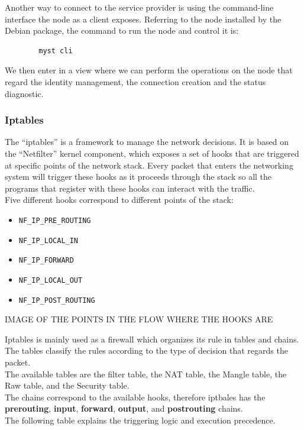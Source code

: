 \documentclass[12pt]{article}
\begin{document}
	Another way to connect to the service provider is using the command-line interface the node as a client exposes. Referring to the node installed by the Debian package, the command to run the node and control it is:\\
	
	\begin{verbatim}
		myst cli
	\end{verbatim}

	We then enter in a view where we can perform the operations on the node that regard the identity management, the connection creation and the status diagnostic.

	\subsubsection{Iptables}

	The ``iptables'' is a framework to manage the network decisions. It is based on the ``Netfilter'' kernel component, which exposes a set of hooks that are triggered at specific points of the network stack. Every packet that enters the networking system will trigger these hooks as it proceeds through the stack so all the programs that register with these hooks can interact with the traffic.\\
	Five different hooks correspond to different points of the stack:\\

	\begin{itemize}
		\item \lstinline{NF_IP_PRE_ROUTING}
		\item \lstinline{NF_IP_LOCAL_IN}
		\item \lstinline{NF_IP_FORWARD}
		\item \lstinline{NF_IP_LOCAL_OUT}
		\item \lstinline{NF_IP_POST_ROUTING}
	\end{itemize}

	IMAGE OF THE POINTS IN THE FLOW WHERE THE HOOKS ARE
	
	Iptables is mainly used as a firewall which organizes its rule in tables and chains. The tables classify the rules according to the type of decision that regards the packet.\\
	The available tables are the filter table, the NAT table, the Mangle table, the Raw table, and the Security table.\\
	The chains correspond to the available hooks, therefore iptbales has the \textbf{prerouting}, \textbf{input}, \textbf{forward}, \textbf{output}, and \textbf{postrouting} chains.\\
	The following table explains the triggering logic and execution precedence.\\
\end{document}
